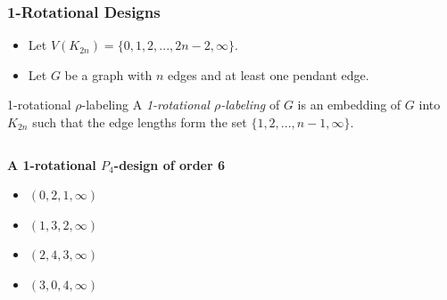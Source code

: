 \documentclass[11pt,serif,professionalfont,aspectratio=169]{beamer}
\newcommand{\vertex}{\node[vertex]}
\theoremstyle{plain}
\begin{document}
\begin{frame}
\frametitle{1-Rotational Designs}
\begin{itemize}
\item Let $V(K_{2n})=\{0,1,2,...,2n-2,\infty\}.$\\

\item Let $G$ be a graph with $n$ edges and at least one pendant edge.
\end{itemize}

\begin{block}{1-rotational $\rho$-labeling}
A \emph{1-rotational $\rho$-labeling} of $G$ is an embedding of $G$ into $K_{2n}$ such that the edge lengths form the set $\{1,2,...,n-1,\infty\}.$
\end{block}

\begin{columns}[T] %
\begin{column}{.48\textwidth}
\textbf{A 1-rotational $P_{4}$-design of order 6}
\begin{itemize}
\item \color{black} $(0,2,1,\infty)$ 
\item \color{blue} $(1,3,2,\infty)$ 
\item \color{red} $(2,4,3,\infty)$ 
\item \color{green} $(3,0,4,\infty)$ 

\end{itemize}
\end{column}%
\hfill%
\begin{column}{.48\textwidth}
\begin{center}
\end{center}
\end{column}
\end{columns}
\end{frame}
\end{document}
